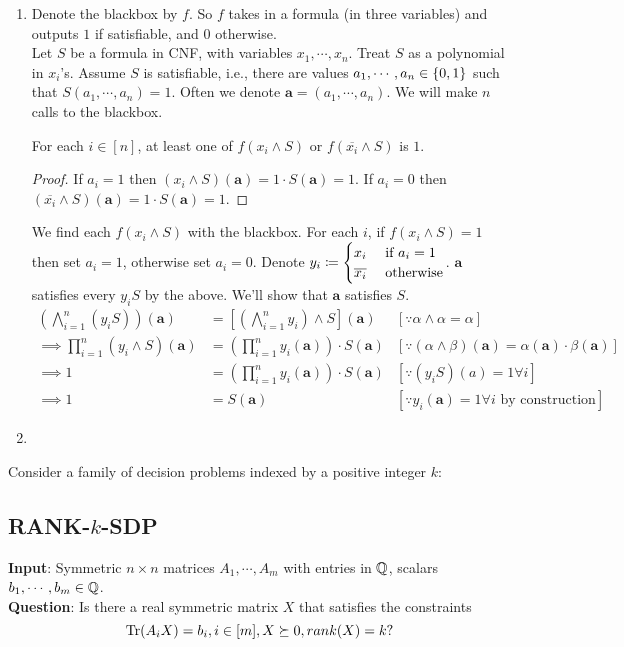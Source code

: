 \soln

\begin{enumerate}[leftmargin=*]
\item Denote the blackbox by $f$. So $f$ takes in a formula (in three variables) and outputs $1$ if satisfiable, and $0$ otherwise. \\
Let $S$ be a formula in CNF, with variables $x_{1},\cdots,x_{n}$. Treat $S$ as a polynomial in $x_{i}$'s. Assume $S$ is satisfiable, i.e., there are values $a_{1},\cdots,a_{n}\in\left\{0,1\right\}$ such that $S(a_{1},\cdots,a_{n})=1$. Often we denote $\pmb a = (a_{1},\cdots,a_{n})$. We will make $n$ calls to the blackbox.
\begin{cl}
For each $i\in[n]$, at least one of $f(x_{i}\land S)$ or $f(\overline{x_{i}}\land S)$ is $1$.
\end{cl}
\begin{proof}
If $a_{i}=1$ then $\left(x_{i}\land S\right)(\pmb a) = 1\cdot S(\pmb a) = 1$. 
If $a_{i}=0$ then $\left(\overline{x_{i}}\land S\right)(\pmb a) = 1\cdot S(\pmb a) = 1$.\end{proof}

We find each $f(x_{i}\land S)$ with the blackbox. For each $i$, if $f(x_{i}\land S) = 1$ then set $a_{i}=1$, otherwise set $a_{i}=0$. Denote $y_{i} \coloneqq \begin{cases}x_{i}&\text{ if }a_{i}=1\\\overline{x_{i}}&\text{ otherwise}\end{cases}$. $\pmb a$ satisfies every $y_{i}S$ by the above. We'll show that $\pmb a$ satisfies $S$. 
\begin{align*}\left(\bigwedge_{i=1}^{n}(y_{i}S)\right)(\pmb a) &= \left[\left(\bigwedge_{i=1}^{n}y_{i}\right) \land S\right](\pmb a)&[\because \alpha\land \alpha = \alpha]\\
\implies \prod_{i=1}^{n}(y_{i}\land S)(\pmb a) &= \left(\prod_{i=1}^{n}y_{i}(\pmb a)\right) \cdot S(\pmb a) &[\because(\alpha\land \beta)(\pmb a) = \alpha(\pmb a)\cdot\beta(\pmb a)]\\
\implies 1 &= \left(\prod_{i=1}^{n}y_{i}(\pmb a)\right) \cdot S(\pmb a) &[\because(y_{i}S)(a) = 1\forall i]\\
\implies 1 &=  S(\pmb a) &[\because y_{i}(\pmb a) = 1\forall i \text{ by construction}]
\end{align*}
\item 
\end{enumerate}


\newpage

\pb

Consider a family of decision problems indexed by a positive integer $k$:
\subsection*{RANK-$k$-SDP}
\textbf{Input}: Symmetric $n\times n$ matrices $A_{1},\cdots,A_{m}$ with entries in $\mathbb{Q}$, scalars $b_{1},\cdots,b_{m} \in\mathbb{Q}$. \\
\textbf{Question}: Is there a real symmetric matrix $X$ that satisfies the constraints
$$\operatorname{Tr}(A_{i}X) = b_{i},i \in[m], X \succeq 0, rank(X) = k?$$





